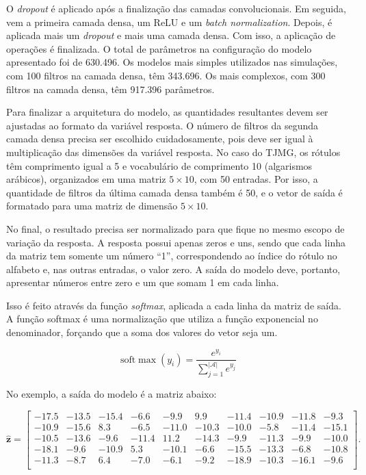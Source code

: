 \documentclass[12pt,twoside,brazilian]{book}
\begin{document}
O \emph{dropout} é aplicado após a finalização das camadas
convolucionais. Em seguida, vem a primeira camada densa, um ReLU e um
\emph{batch normalization}. Depois, é aplicada mais um \emph{dropout} e
mais uma camada densa. Com isso, a aplicação de operações é finalizada.
O total de parâmetros na configuração do modelo apresentado foi de
630.496. Os modelos mais simples utilizados nas simulações, com 100
filtros na camada densa, têm 343.696. Os mais complexos, com 300 filtros
na camada densa, têm 917.396 parâmetros.

Para finalizar a arquitetura do modelo, as quantidades resultantes devem
ser ajustadas ao formato da variável resposta. O número de filtros da
segunda camada densa precisa ser escolhido cuidadosamente, pois deve ser
igual à multiplicação das dimensões da variável resposta. No caso do
TJMG, os rótulos têm comprimento igual a 5 e vocabulário de comprimento
10 (algarismos arábicos), organizados em uma matriz \(5\times10\), com
50 entradas. Por isso, a quantidade de filtros da última camada densa
também é 50, e o vetor de saída é formatado para uma matriz de dimensão
\(5\times10\).

No final, o resultado precisa ser normalizado para que fique no mesmo
escopo de variação da resposta. A resposta possui apenas zeros e uns,
sendo que cada linha da matriz tem somente um número ``1'',
correspondendo ao índice do rótulo no alfabeto e, nas outras entradas, o
valor zero. A saída do modelo deve, portanto, apresentar números entre
zero e um que somam 1 em cada linha.

Isso é feito através da função \emph{softmax}, aplicada a cada linha da
matriz de saída. A função softmax é uma normalização que utiliza a
função exponencial no denominador, forçando que a soma dos valores do
vetor seja um.

\[
\text{soft}\max(y_i) = \frac{e^{y_i}}{\sum_{j=1}^{|\mathcal A|} e^{y_j}}
\]

No exemplo, a saída do modelo é a matriz abaixo:

\[
\hat{\mathbf z} = \left[\begin{array}{rrrrrrrrrr}
  -17.5 & -13.5 & -15.4 & -6.6 & -9.9 & 9.9 & -11.4 & -10.9 & -11.8 & -9.3 \\ 
  -10.9 & -15.6 & 8.3 & -6.5 & -11.0 & -10.3 & -10.0 & -5.8 & -11.4 & -15.1 \\ 
  -10.5 & -13.6 & -9.6 & -11.4 & 11.2 & -14.3 & -9.9 & -11.3 & -9.9 & -10.0 \\ 
  -18.1 & -9.6 & -10.9 & 5.3 & -10.1 & -6.6 & -15.5 & -13.3 & -6.8 & -10.8 \\ 
  -11.3 & -8.7 & 6.4 & -7.0 & -6.1 & -9.2 & -18.9 & -10.3 & -16.1 & -9.6 \\ 
\end{array}\right].
\]
\end{document}
